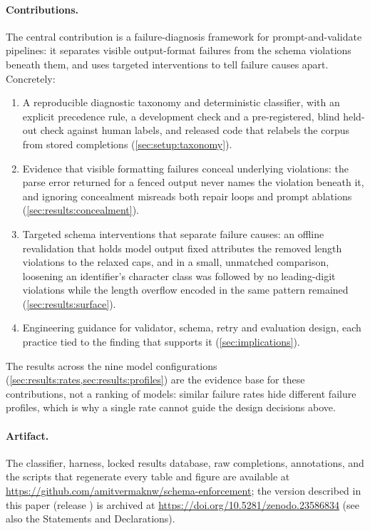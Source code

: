 \paragraph{Contributions.}
The central contribution is a failure-diagnosis framework for
prompt-and-validate pipelines: it separates visible output-format
failures from the schema violations beneath them, and uses targeted
interventions to tell failure causes apart. Concretely:
\begin{enumerate}[leftmargin=1.4em,itemsep=1pt,topsep=2pt]
  \item A reproducible diagnostic taxonomy and deterministic classifier,
  with an explicit precedence rule, a development check and a
  pre-registered, blind held-out check against human labels, and released
  code that relabels the corpus from stored completions
  (\cref{sec:setup:taxonomy}).
  \item Evidence that visible formatting failures conceal underlying
  violations: the parse error returned for a fenced output never names
  the violation beneath it, and ignoring concealment misreads both repair
  loops and prompt ablations (\cref{sec:results:concealment}).
  \item Targeted schema interventions that separate failure causes: an
  offline revalidation that holds model output fixed attributes the
  removed length violations to the relaxed caps, and in a small,
  unmatched comparison, loosening an identifier's character class was
  followed by no leading-digit violations while the length overflow
  encoded in the same pattern remained
  (\cref{sec:results:surface}).
  \item Engineering guidance for validator, schema, retry and evaluation
  design, each practice tied to the finding that supports it
  (\cref{sec:implications}).
\end{enumerate}
The results across the nine model configurations
(\cref{sec:results:rates,sec:results:profiles}) are the evidence base for
these contributions, not a ranking of models: similar failure rates hide
different failure profiles, which is why a single rate cannot guide the
design decisions above.

\paragraph{Artifact.} The classifier, harness, locked results database,
raw completions, annotations, and the scripts that regenerate every table
and figure are available at \url{https://github.com/amitvermaknw/schema-enforcement};
the version described in this paper (release ) is
archived at \url{https://doi.org/10.5281/zenodo.23586834}
(see also the Statements and Declarations).
